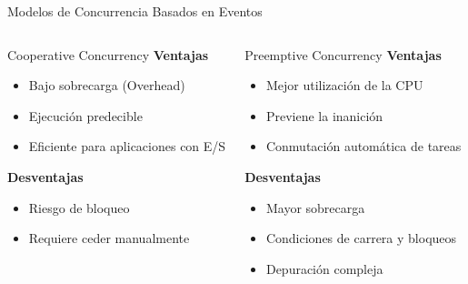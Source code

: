 \documentclass[11pt]{beamer}
\begin{document}
	
	\begin{frame}{Modelos de Concurrencia Basados en Eventos}
		\small
		
		\begin{columns}[T]
			
			\begin{block}{Cooperative Concurrency}
				\textbf{Ventajas}
				\begin{itemize}
					\item Bajo sobrecarga (Overhead)
					\item Ejecución predecible
					\item Eficiente para aplicaciones con E/S
				\end{itemize}
				
				\vspace{0.2cm}
				\textbf{Desventajas}
				\begin{itemize}
					\item Riesgo de bloqueo
					\item Requiere ceder manualmente
				\end{itemize}
			\end{block}
			
			
			\begin{block}{Preemptive Concurrency}
				\textbf{Ventajas}
				\begin{itemize}
					\item Mejor utilización de la CPU
					\item Previene la inanición
					\item Conmutación automática de tareas
				\end{itemize}
				
				\vspace{0.2cm}
				\textbf{Desventajas}
				\begin{itemize}
					\item Mayor sobrecarga
					\item Condiciones de carrera y bloqueos
					\item Depuración compleja
				\end{itemize}
			\end{block}
			
		\end{columns}
	\end{frame}
	
\end{document}
